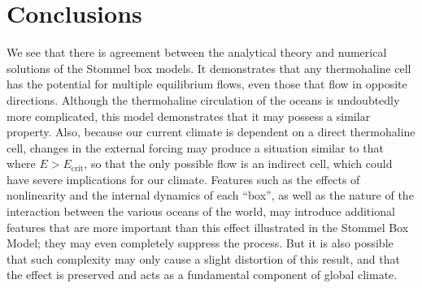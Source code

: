 \documentclass[letterpaper, 11pt]{article}
\begin{document}

\section{Conclusions}

We see that there is agreement between the analytical theory and numerical solutions of the Stommel box models. It demonstrates that any thermohaline cell has the potential for multiple equilibrium flows, even those that flow in opposite directions. Although the thermohaline circulation of the oceans is undoubtedly more complicated, this model demonstrates that it may possess a similar property. Also, because our current climate is dependent on a direct thermohaline cell, changes in the external forcing may produce a situation similar to that where $E > E_\mathrm{crit}$, so that the only possible flow is an indirect cell, which could have severe implications for our climate. Features such as the effects of nonlinearity and the internal dynamics of each ``box'', as well as the nature of the interaction between the various oceans of the world, may introduce additional features that are more important than this effect illustrated in the Stommel Box Model; they may even completely suppress the process. But it is also possible that such complexity may only cause a slight distortion of this result, and that the effect is preserved and acts as a fundamental component of global climate.
\end{document}
